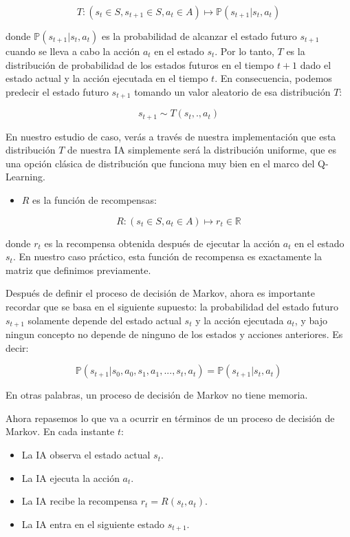 \documentclass[
]{book}
\providecommand{\tightlist}{%
  \setlength{\itemsep}{0pt}\setlength{\parskip}{0pt}}
\begin{document}
\[T : (s_t \in S, s_{t+1} \in S, a_t \in A) \mapsto \mathbb{P}(s_{t+1}|s_t,a_t)\]

donde \(\mathbb {P} (s_{t + 1} | s_t, a_t)\) es la probabilidad de alcanzar el estado futuro \(s_{t + 1}\) cuando se lleva a cabo la acción \(a_t\) en el estado \(s_t\). Por lo tanto, \(T\) es la distribución de probabilidad de los estados futuros en el tiempo \(t + 1\) dado el estado actual y la acción ejecutada en el tiempo \(t\). En consecuencia, podemos predecir el estado futuro \(s_{t + 1}\) tomando un valor aleatorio de esa distribución \(T\):

\[s_{t+1} \sim T(s_t,.,a_t)\]

En nuestro estudio de caso, verás a través de nuestra implementación que esta distribución \(T\) de nuestra IA simplemente será la distribución uniforme, que es una opción clásica de distribución que funciona muy bien en el marco del Q-Learning.

\begin{itemize}
\tightlist
\item
  \(R\) es la función de recompensas:
\end{itemize}

\[R : (s_t \in S, a_t \in A) \mapsto r_t \in \mathbb{R}\]

donde \(r_t\) es la recompensa obtenida después de ejecutar la acción \(a_t\) en el estado \(s_t\). En nuestro caso práctico, esta función de recompensa es exactamente la matriz que definimos previamente.

Después de definir el proceso de decisión de Markov, ahora es importante recordar que se basa en el siguiente supuesto: la probabilidad del estado futuro \(s_{t + 1}\) solamente depende del estado actual \(s_t\) y la acción ejecutada \(a_t\), y bajo ningun concepto no depende de ninguno de los estados y acciones anteriores. Es decir:

\[\mathbb{P}(s_{t+1}|s_0,a_0,s_1,a_1,...,s_t,a_t) = \mathbb{P}(s_{t+1}|s_t,a_t)\]

En otras palabras, un proceso de decisión de Markov no tiene memoria.

\newpage

Ahora repasemos lo que va a ocurrir en términos de un proceso de decisión de Markov. En cada instante \(t\):

\begin{itemize}
\tightlist
\item
  La IA observa el estado actual \(s_t\).
\item
  La IA ejecuta la acción \(a_t\).
\item
  La IA recibe la recompensa \(r_t = R(s_t, a_t)\).
\item
  La IA entra en el siguiente estado \(s_{t+1}\).
\end{itemize}
\end{document}
